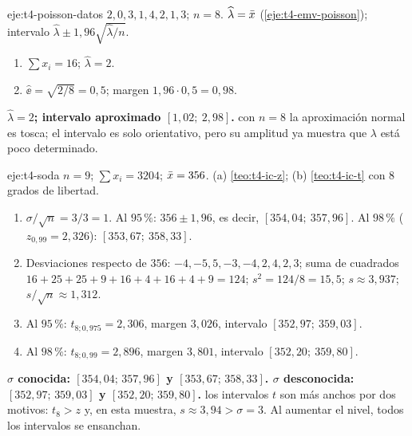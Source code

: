 \begin{solucion}{eje:t4-poisson-datos}
\datos $2,0,3,1,4,2,1,3$; $n=8$.
\planteamiento $\widehat\lambda=\bar{x}$ (\cref{eje:t4-emv-poisson}); intervalo $\widehat\lambda\pm1{,}96\sqrt{\widehat\lambda/n}$.
\pasos
\begin{enumerate}[label=\arabic*.]
  \item $\sum x_i=16$; $\widehat\lambda=2$.
  \item $\widehat{\ee}=\sqrt{2/8}=0{,}5$; margen $1{,}96\cdot0{,}5=0{,}98$.
\end{enumerate}
\resultado \textbf{$\widehat\lambda=2$; intervalo aproximado $[1{,}02;\allowbreak\ 2{,}98]$.}
\comprobacion con $n=8$ la aproximación normal es tosca; el intervalo es solo orientativo, pero su amplitud ya muestra que $\lambda$ está poco determinado.
\end{solucion}

\begin{solucion}{eje:t4-soda}
\datos $n=9$; $\sum x_i=3204$; $\bar{x}=356$.
\planteamiento (a) \cref{teo:t4-ic-z}; (b) \cref{teo:t4-ic-t} con $8$ grados de libertad.
\pasos
\begin{enumerate}[label=\arabic*.]
  \item $\sigma/\sqrt n=3/3=1$. Al $95\,\%$: $356\pm1{,}96$, es decir, $[354{,}04;\allowbreak\ 357{,}96]$. Al $98\,\%$ ($z_{0{,}99}=2{,}326$): $[353{,}67;\allowbreak\ 358{,}33]$.
  \item Desviaciones respecto de $356$: $-4,-5,5,-3,-4,2,4,2,3$; suma de cuadrados $16+25+25+9+16+4+16+4+9=124$; $s^{2}=124/8=15{,}5$; $s\approx3{,}937$; $s/\sqrt n\approx1{,}312$.
  \item Al $95\,\%$: $t_{8;0{,}975}=2{,}306$, margen $3{,}026$, intervalo $[352{,}97;\allowbreak\ 359{,}03]$.
  \item Al $98\,\%$: $t_{8;0{,}99}=2{,}896$, margen $3{,}801$, intervalo $[352{,}20;\allowbreak\ 359{,}80]$.
\end{enumerate}
\resultado \textbf{$\sigma$ conocida: $[354{,}04;\allowbreak\,357{,}96]$ y $[353{,}67;\allowbreak\,358{,}33]$. $\sigma$ desconocida: $[352{,}97;\allowbreak\,359{,}03]$ y $[352{,}20;\allowbreak\,359{,}80]$.}
\comprobacion los intervalos $t$ son más anchos por dos motivos: $t_{8}>z$ y, en esta muestra, $s\approx3{,}94>\sigma=3$. Al aumentar el nivel, todos los intervalos se ensanchan.
\end{solucion}

